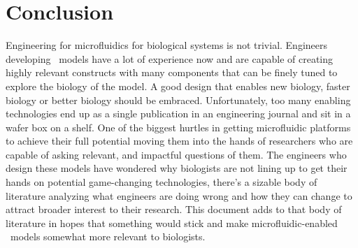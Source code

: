 \chapter{Conclusion}
\label{Chap:conclusion}

Engineering for microfluidics for biological systems is not trivial. Engineers developing \invitro\ models have a lot of experience now and are capable of creating highly relevant constructs with many components that can be finely tuned to explore the biology of the model. A good design that enables new biology, faster biology or better biology should be embraced. Unfortunately, too many enabling technologies end up as a single publication in an engineering journal and sit in a wafer box on a shelf. One of the biggest hurtles in getting microfluidic platforms to achieve their full potential moving them into the hands of researchers who are capable of asking relevant, and impactful questions of them. The engineers who design these models have wondered why biologists are not lining up to get their hands on potential game-changing technologies, there's a sizable body of literature analyzing what engineers are doing wrong and how they can change to attract broader interest to their research. This document adds to that body of literature in hopes that something would stick and make microfluidic-enabled \invitro\ models somewhat more relevant to biologists. 